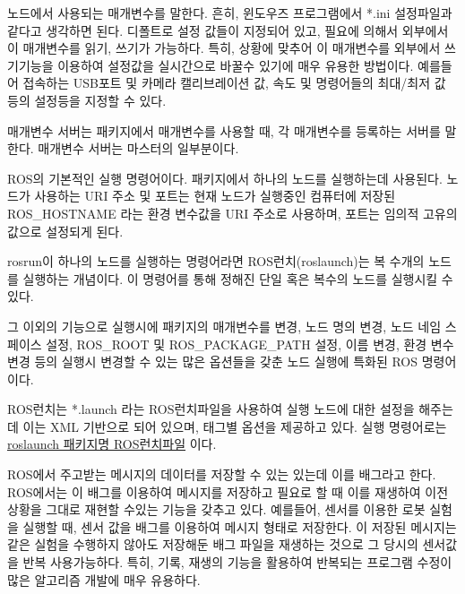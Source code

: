 \vspace{\baselineskip}
\begin{definition}\label{def:RosParameter}
노드에서 사용되는 매개변수를 말한다. 흔히, 윈도우즈 프로그램에서 *.ini 설정파일과 같다고 생각하면 된다. 디폴트로 설정 값들이 지정되어 있고, 필요에 의해서 외부에서 이 매개변수를 읽기, 쓰기가 가능하다. 특히, 상황에 맞추어 이 매개변수를 외부에서 쓰기기능을 이용하여 설정값을 실시간으로 바꿀수 있기에 매우 유용한 방법이다. 예를들어 접속하는 USB포트 및 카메라 캘리브레이션 값, 속도 및 명령어들의 최대/최저 값 등의 설정등을 지정할 수 있다.
\end{definition}

\vspace{\baselineskip}
\begin{definition}\label{def:RosParameterServer}
매개변수 서버는 패키지에서 매개변수를 사용할 때, 각 매개변수를 등록하는 서버를 말한다. 매개변수 서버는 마스터의 일부분이다. 
\end{definition}

\vspace{\baselineskip}
\begin{definition}[rosrun]\label{def:RosRun}
ROS의 기본적인 실행 명령어이다. 패키지에서 하나의 노드를 실행하는데 사용된다. 노드가 사용하는 URI 주소 및 포트는 현재 노드가 실행중인 컴퓨터에 저장된 ROS\_HOSTNAME 라는 환경 변수값을 URI 주소로 사용하며, 포트는 임의적 고유의 값으로 설정되게 된다.
\end{definition}

\vspace{\baselineskip}
\begin{definition}[roslaunch]\label{def:RosLaunch}
rosrun이 하나의 노드를 실행하는 명령어라면 ROS런치(roslaunch)는 복 수개의 노드를 실행하는 개념이다. 이 명령어를 통해 정해진 단일 혹은 복수의 노드를 실행시킬 수 있다. 

그 이외의 기능으로 실행시에 패키지의 매개변수를 변경, 노드 명의 변경, 노드 네임 스페이스 설정, ROS\_ROOT 및 ROS\_PACKAGE\_PATH 설정, 이름 변경, 환경 변수 변경 등의 실행시 변경할 수 있는 많은 옵션들을 갖춘 노드 실행에 특화된 ROS 명령어이다. 

ROS런치는 *.launch 라는 ROS런치파일을 사용하여 실행 노드에 대한 설정을 해주는데 이는 XML 기반으로 되어 있으며, 태그별 옵션을 제공하고 있다. 실행 명령어로는 \underline{roslaunch 패키지명 ROS런치파일} 이다.
\end{definition}

\vspace{\baselineskip}
\begin{definition}[배그(bag)]\label{def:RosBag}
ROS에서 주고받는 메시지의 데이터를 저장할 수 있는 있는데 이를 배그라고 한다. ROS에서는 이 배그를 이용하여 메시지를 저장하고 필요로 할 때 이를 재생하여 이전 상황을 그대로 재현할 수있는 기능을 갖추고 있다. 예를들어, 센서를 이용한 로봇 실험을 실행할 때, 센서 값을 배그를 이용하여 메시지 형태로 저장한다. 이 저장된 메시지는 같은 실험을 수행하지 않아도 저장해둔 배그 파일을 재생하는 것으로 그 당시의 센서값을 반복 사용가능하다. 특히, 기록, 재생의 기능을 활용하여 반복되는 프로그램 수정이 많은 알고리즘 개발에 매우 유용하다. 
\end{definition}

